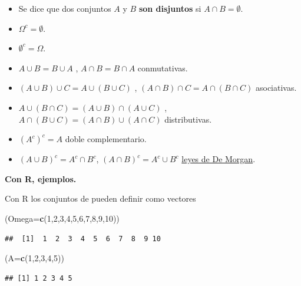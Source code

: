 \documentclass[]{book}
\newenvironment{Shaded}{\begin{snugshade}}{\end{snugshade}}
\newcommand{\DataTypeTok}[1]{\textcolor[rgb]{0.13,0.29,0.53}{#1}}
\newcommand{\DecValTok}[1]{\textcolor[rgb]{0.00,0.00,0.81}{#1}}
\newcommand{\KeywordTok}[1]{\textcolor[rgb]{0.13,0.29,0.53}{\textbf{#1}}}
\newcommand{\NormalTok}[1]{#1}
\providecommand{\tightlist}{%
  \setlength{\itemsep}{0pt}\setlength{\parskip}{0pt}}
\begin{document}
\begin{itemize}
\tightlist
\item
  Se dice que dos conjuntos \(A\) y \(B\) \textbf{son disjuntos} si \(A\cap B=\emptyset.\)
\item
  \(\Omega^c=\emptyset\).
\item
  \(\emptyset^c=\Omega\).
\item
  \(A\cup B=B \cup A\) , \(A\cap B=B\cap A\) conmutativas.
\item
  \((A\cup B) \cup C = A \cup( B \cup C)\) , \((A\cap B) \cap C = A \cap( B \cap C)\) asociativas.
\item
  \(A\cup (B\cap C)=(A\cup B) \cap (A\cup C)\) , \(A\cap (B\cup C)=(A\cap B) \cup (A\cap C)\) distributivas.
\item
  \(\left(A^c\right)^c=A\) doble complementario.
\item
  \(\left(A\cup B\right)^c=A^c \cap B^c\), \(\left(A\cap B\right)^c=A^c \cup B^c\) \href{https://es.wikipedia.org/wiki/Leyes_de_De_Morgan}{leyes de De Morgan}.
\end{itemize}

\textbf{Con R, ejemplos.}

Con R los conjuntos de pueden definir como vectores

\begin{Shaded}
\begin{Highlighting}[]
\NormalTok{(}\DataTypeTok{Omega=}\KeywordTok{c}\NormalTok{(}\DecValTok{1}\NormalTok{,}\DecValTok{2}\NormalTok{,}\DecValTok{3}\NormalTok{,}\DecValTok{4}\NormalTok{,}\DecValTok{5}\NormalTok{,}\DecValTok{6}\NormalTok{,}\DecValTok{7}\NormalTok{,}\DecValTok{8}\NormalTok{,}\DecValTok{9}\NormalTok{,}\DecValTok{10}\NormalTok{))}
\end{Highlighting}
\end{Shaded}

\begin{verbatim}
##  [1]  1  2  3  4  5  6  7  8  9 10
\end{verbatim}

\begin{Shaded}
\begin{Highlighting}[]
\NormalTok{(}\DataTypeTok{A=}\KeywordTok{c}\NormalTok{(}\DecValTok{1}\NormalTok{,}\DecValTok{2}\NormalTok{,}\DecValTok{3}\NormalTok{,}\DecValTok{4}\NormalTok{,}\DecValTok{5}\NormalTok{))}
\end{Highlighting}
\end{Shaded}

\begin{verbatim}
## [1] 1 2 3 4 5
\end{verbatim}
\end{document}
